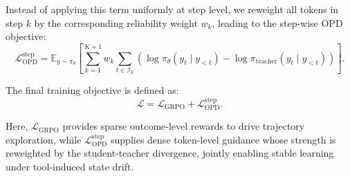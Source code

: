 Instead of applying this term uniformly at step level, we reweight all tokens in step $k$ by the corresponding reliability weight $w_k$, leading to the step-wise OPD objective:
\begin{equation}
    \mathcal{L}_{\mathrm{OPD}}^{\mathrm{step}}
    =
    \mathbb{E}_{y \sim \pi_\theta}
    \left[
    \sum_{k=1}^{K+1}
    w_k
    \sum_{t \in \mathcal{I}_k}
    \left(
    \log \pi_\theta(y_t \mid y_{<t})
    -
    \log \pi_{\mathrm{teacher}}(y_t \mid y_{<t})
    \right)
    \right].
\label{eq:step_opd}
\end{equation}

The final training objective is defined as:
\begin{equation}
\label{eq:training_object}
    \mathcal{L}
    =
    \mathcal{L}_{\mathrm{GRPO}}
    +
    \mathcal{L}_{\mathrm{OPD}}^{\mathrm{step}}.
\end{equation}


Here, $\mathcal{L}_{\mathrm{GRPO}}$ provides sparse outcome-level rewards to drive trajectory exploration, while $\mathcal{L}_{\mathrm{OPD}}^{\mathrm{step}}$ supplies dense token-level guidance whose strength is reweighted by the student-teacher divergence, jointly enabling stable learning under tool-induced state drift.
